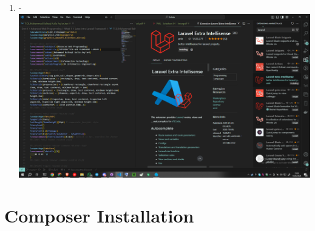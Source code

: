 \documentclass[12pt,titlepage]{article}
\begin{document}
\begin{enumerate}[label= \alph*.]
    \item - \\ \includegraphics[width=.9\textwidth]{images/figures/VSCode 4.png}
\end{enumerate}

\newpage

\section{Composer Installation}
\end{document}
